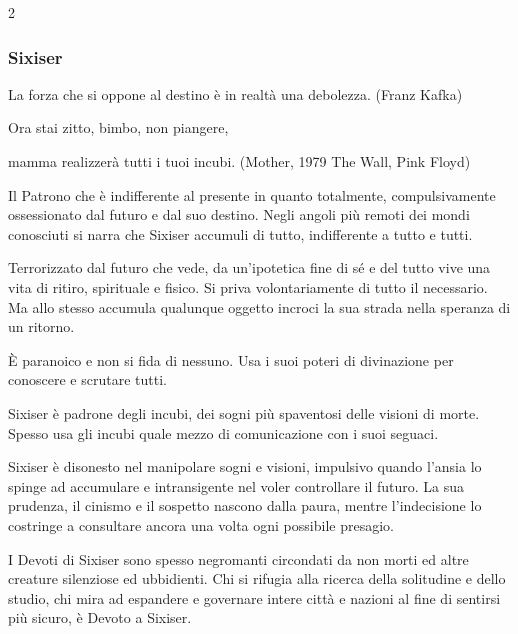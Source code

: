 \begin{multicols}{2}
\subsubsection{Sixiser}\label{sixiser}\hypertarget{sixiser}{}

\begin{enfasi}{
La forza che si oppone al destino è in realtà una debolezza. (Franz Kafka)

\medskip

Ora stai zitto, bimbo, non piangere,

mamma realizzerà tutti i tuoi incubi. (Mother, 1979 The Wall, Pink Floyd)

}\end{enfasi}

Il Patrono che è indifferente al presente in quanto totalmente, compulsivamente ossessionato dal futuro e dal suo destino. Negli angoli più remoti dei mondi conosciuti si narra che Sixiser accumuli di tutto, indifferente a tutto e tutti.

Terrorizzato dal futuro che vede, da un'ipotetica fine di sé e del tutto vive una vita di ritiro, spirituale e fisico. Si priva volontariamente di tutto il necessario. Ma allo stesso accumula qualunque oggetto incroci la sua strada nella speranza di un ritorno.

È paranoico e non si fida di nessuno. Usa i suoi poteri di divinazione per conoscere e scrutare tutti.

Sixiser è padrone degli incubi, dei sogni più spaventosi delle visioni di morte. Spesso usa gli incubi quale mezzo di comunicazione con i suoi seguaci.

Sixiser è disonesto nel manipolare sogni e visioni, impulsivo quando l'ansia lo spinge ad accumulare e intransigente nel voler controllare il futuro. La sua prudenza, il cinismo e il sospetto nascono dalla paura, mentre l'indecisione lo costringe a consultare ancora una volta ogni possibile presagio.

I Devoti di Sixiser sono spesso negromanti circondati da non morti ed altre creature silenziose ed ubbidienti. Chi si rifugia alla ricerca della solitudine e dello studio, chi mira ad espandere e governare intere città e nazioni al fine di sentirsi più sicuro, è Devoto a Sixiser.


\end{multicols}

